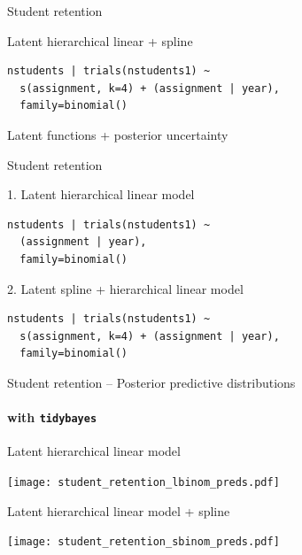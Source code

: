\documentclass[t]{beamer}
\begin{document}
\begin{frame}[fragile]{Student retention}

  Latent hierarchical linear + spline

{\footnotesize
\begin{verbatim}
nstudents | trials(nstudents1) ~
  s(assignment, k=4) + (assignment | year),
  family=binomial()
\end{verbatim}
}

  Latent functions + posterior uncertainty\\\hspace{-5mm}

  
\end{frame}

\begin{frame}[fragile]{Student retention}

1. Latent hierarchical linear model
\begin{verbatim}
nstudents | trials(nstudents1) ~
  (assignment | year),
  family=binomial()
\end{verbatim}

2. Latent spline + hierarchical linear model
\begin{verbatim}
nstudents | trials(nstudents1) ~
  s(assignment, k=4) + (assignment | year),
  family=binomial()
\end{verbatim}
  
\end{frame}

\begin{frame}[fragile]{Student retention -- Posterior predictive distributions}
\framesubtitle{with \texttt{tidybayes}}
  
\vspace{-0.75\baselineskip}  
Latent hierarchical linear model\\  
  \hspace{-7mm}
  \begin{minipage}[t][3.6cm][t]{1.0\linewidth}
    \texttt{[image: student\_retention\_lbinom\_preds.pdf]}
  \end{minipage}
  
\vspace{-0.25\baselineskip}  
Latent hierarchical linear model + spline\\  
  \hspace{-7mm}
  \begin{minipage}[t][3.6cm][t]{1.0\linewidth}
  \texttt{[image: student\_retention\_sbinom\_preds.pdf]}
  \end{minipage}  

\end{frame}
\end{document}
